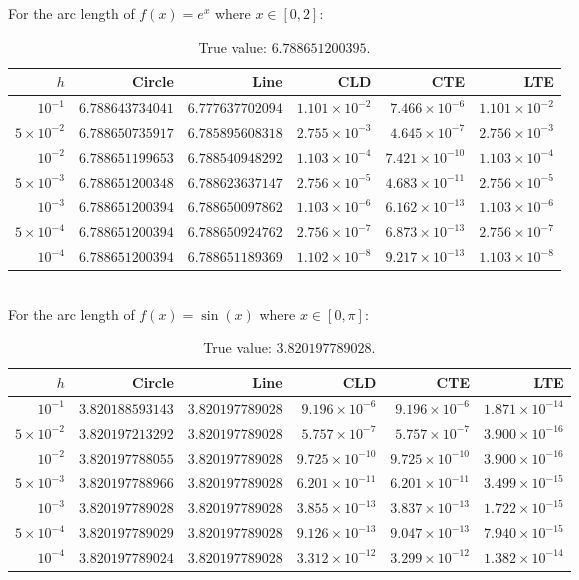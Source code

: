 \documentclass{article}
\begin{document}
For the arc length of $f(x)=e^x$ where $x\in[0,2]$:
\begin{table}[h]
\centering
\begin{tabular}{rrrrrr}
\hline
$h$ & Circle & Line & CLD & CTE & LTE\\
\hline
$10^{-1}$ & $6.788643734041$ & $6.777637702094$ & $1.101\times10^{-2}$ & $7.466\times10^{-6}$ & $1.101\times10^{-2}$\\
$5\times10^{-2}$ & $6.788650735917$ & $6.785895608318$ & $2.755\times10^{-3}$ & $4.645\times10^{-7}$ & $2.756\times10^{-3}$\\
$10^{-2}$ & $6.788651199653$ & $6.788540948292$ & $1.103\times10^{-4}$ & $7.421\times10^{-10}$ & $1.103\times10^{-4}$\\
$5\times10^{-3}$ & $6.788651200348$ & $6.788623637147$ & $2.756\times10^{-5}$ & $4.683\times10^{-11}$ & $2.756\times10^{-5}$\\
$10^{-3}$ & $6.788651200394$ & $6.788650097862$ & $1.103\times10^{-6}$ & $6.162\times10^{-13}$ & $1.103\times10^{-6}$\\
$5\times10^{-4}$ & $6.788651200394$ & $6.788650924762$ & $2.756\times10^{-7}$ & $6.873\times10^{-13}$ & $2.756\times10^{-7}$\\
$10^{-4}$ & $6.788651200394$ & $6.788651189369$ & $1.102\times10^{-8}$ & $9.217\times10^{-13}$ & $1.103\times10^{-8}$\\
\hline
\end{tabular}
\caption{True value: $6.788651200395$.}
\end{table}
\\

For the arc length of $f(x)=\sin(x)$ where $x\in[0,\pi]$:
\begin{table}[h]
\centering
\begin{tabular}{rrrrrr}
\hline
$h$ & Circle & Line & CLD & CTE & LTE\\
\hline
$10^{-1}$ & $3.820188593143$ & $3.820197789028$ & $9.196\times10^{-6}$ & $9.196\times10^{-6}$ & $1.871\times10^{-14}$\\
$5\times10^{-2}$ & $3.820197213292$ & $3.820197789028$ & $5.757\times10^{-7}$ & $5.757\times10^{-7}$ & $3.900\times10^{-16}$\\
$10^{-2}$ & $3.820197788055$ & $3.820197789028$ & $9.725\times10^{-10}$ & $9.725\times10^{-10}$ & $3.900\times10^{-16}$\\
$5\times10^{-3}$ & $3.820197788966$ & $3.820197789028$ & $6.201\times10^{-11}$ & $6.201\times10^{-11}$ & $3.499\times10^{-15}$\\
$10^{-3}$ & $3.820197789028$ & $3.820197789028$ & $3.855\times10^{-13}$ & $3.837\times10^{-13}$ & $1.722\times10^{-15}$\\
$5\times10^{-4}$ & $3.820197789029$ & $3.820197789028$ & $9.126\times10^{-13}$ & $9.047\times10^{-13}$ & $7.940\times10^{-15}$\\
$10^{-4}$ & $3.820197789024$ & $3.820197789028$ & $3.312\times10^{-12}$ & $3.299\times10^{-12}$ & $1.382\times10^{-14}$\\
\hline
\end{tabular}
\caption{True value: $3.820197789028$.}
\end{table}
\end{document}
